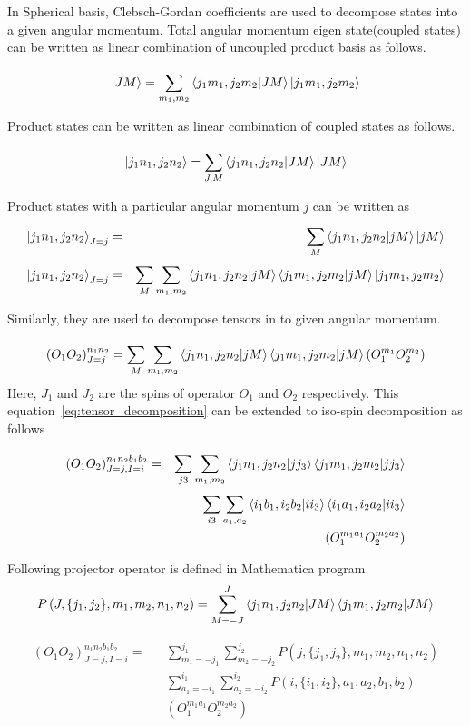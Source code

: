 \documentclass{article}
\newcommand{\beq}{\begin{equation}}
\newcommand{\eeq}{\end{equation}}
\newcommand{\bea}{\begin{eqnarray}}
\newcommand{\eea}{\end{eqnarray}}
\begin{document}
\vspace{5mm}
In Spherical basis, Clebsch-Gordan coefficients are used to decompose states into a given angular momentum. Total angular momentum eigen state(coupled states) can be written as linear combination of uncoupled product basis as follows.

\beq
\ket{JM}= \displaystyle \sum_{m_1,m_2}^{} \bra{j_1 m_1,j_2 m_2} \ket{JM} \ket{j_1 m_1,j_2 m_2} \nonumber 
\eeq

Product states can be written as linear combination of coupled states as follows.  

\beq
\ket{j_1 n_1,j_2 n_2} =\displaystyle \sum_{J,M}^{}  \bra{j_1 n_1,j_2 n_2}\ket{JM} \ket{JM} \nonumber 
\eeq

Product states with a particular angular momentum $j$ can be written as 
\bea
\ket{j_1 n_1,j_2 n_2}_{J=j} =&&\displaystyle \sum_{M}^{}  \bra{j_1 n_1,j_2 n_2}\ket{jM} \ket{jM} \nonumber \\
\ket{j_1 n_1,j_2 n_2}_{J=j} =&&\displaystyle \sum_{M}^{} \sum_{m_1,m_2}^{} \bra{j_1 n_1,j_2 n_2}\ket{jM} \bra{j_1 m_1,j_2 m_2} \ket{jM} \ket{j_1 m_1,j_2 m_2} \nonumber  \label{eq:State_decomposition}
\eea

Similarly, they are used to decompose tensors in to given angular momentum.

\beq
\left(O_1  O_2 \right)^{n_1 n_2 }_{J=j} =\displaystyle \sum_{M}^{} \sum_{m_1,m_2}^{} \bra{j_1 n_1,j_2 n_2}\ket{jM} \bra{j_1 m_1,j_2 m_2} \ket{jM} \left( O^{m_1}_1 O^{m_2}_2\right) \label{eq:tensor_decomposition}
\eeq
Here, $J_1$ and $J_2$ are the spins of operator $ O_1$ and $O_2$ respectively. This equation~\ref{eq:tensor_decomposition} can be extended to iso-spin decomposition as follows

\bea
\left(O_1  O_2 \right)^{n_1 n_2 b_1 b_2}_{J=j,I=i} =&&\displaystyle \sum_{j3}^{} \sum_{m_1,m_2}^{} \bra{j_1 n_1,j_2 n_2}\ket{jj_3} \bra{j_1 m_1,j_2 m_2} \ket{jj_3} \\ \nonumber
&&\displaystyle \sum_{i3}^{} \sum_{a_1,a_2}^{}  \bra{i_1 b_1,i_2 b_2} \ket{ii_3} \bra{i_1 a_1,i_2 a_2}\ket{ii_3} \\ \label{eq:tensor_complete_decomposition}
&& \left( O^{m_1 a_1}_1 O^{m_2 a_2}_2\right) \nonumber
\eea

Following projector operator is defined in Mathematica program.
\beq
P\left( J,\{j_1,j_2\}, m_1,m_2,n_1,n_2\right)  =\displaystyle \sum_{M=-J}^{J} \bra{j_1 n_1,j_2 n_2}\ket{JM} \bra{j_1 m_1,j_2 m_2} \ket{JM} \label{eq:project}
\eeq

\bea
\left(O_1  O_2 \right)^{n_1 n_2 b_1 b_2}_{J=j,I=i} =&&\displaystyle \sum_{m_1=-j_1}^{j_1} \sum_{m_2=-j_2}^{j_2} P\left( j,\{j_1,j_2\}, m_1,m_2,n_1,n_2\right) \\ \nonumber
&&\displaystyle \sum_{a_1=-i_1}^{i_1} \sum_{a_2=-i_2}^{i_2}  P\left( i,\{i_1,i_2\}, a_1,a_2,b_1,b_2\right)\\ \label{eq:tensor_complete_decomposition}
&& \left( O^{m_1 a_1}_1 O^{m_2 a_2}_2\right) \nonumber
\eea
\end{document}
